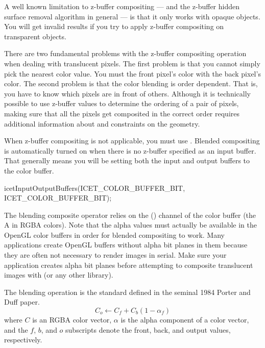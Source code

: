 A well known limitation to z-buffer compositing --- and the z-buffer hidden
surface removal algorithm in general --- is that it only works with opaque
objects.  You will get invalid results if you try to apply z-buffer
compositing on transparent objects.

There are two fundamental problems with the z-buffer compositing operation
when dealing with translucent pixels.  The first problem is that you cannot
simply pick the nearest color value.  You must  the front
pixel's color with the back pixel's color.  The second problem is that the
color blending is order dependent.  That is, you have to know which pixels
are in front of others.  Although it is technically possible to use
z-buffer values to determine the ordering of a pair of pixels, making sure
that all the pixels get composited in the correct order requires additional
information about and constraints on the geometry.

When z-buffer compositing is not applicable, you must use .  Blended compositing is automatically turned on when there
is no z-buffer specified as an input buffer.  That generally means you will
be setting both the input and output buffers to the color buffer.
\begin{code}
  icetInputOutputBuffers(ICET_COLOR_BUFFER_BIT, ICET_COLOR_BUFFER_BIT);
\end{code}

The blending composite operator relies on the 
(\index{$\alpha$}\keyterm{$\alpha$}) channel of the color buffer (the A in
RGBA colors).  Note that the alpha values must actually be available in the
OpenGL color buffers in order for blended compositing to work.  Many
applications create OpenGL buffers without alpha bit planes in them because
they are often not necessary to render images in serial.  Make sure your
application creates alpha bit planes before attempting to composite
translucent images with \IceT (or any other library).

The blending operation is the standard
defined in the seminal 1984 Porter and Duff paper.
\begin{equation}
  C_o \leftarrow C_f + C_b (1 - \alpha_f)
  \label{eq:VolumeRendering:OverOperator}
\end{equation}
where $C$ is an RGBA color vector, $\alpha$ is the alpha component of a
color vector, and the $f$, $b$, and $o$ subscripts denote the front, back,
and output values, respectively.

